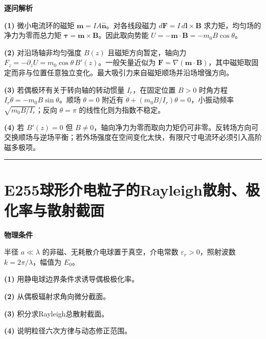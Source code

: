 \documentclass[UTF8,a4paper,11pt,oneside,openany]{ctexbook}
\begin{document}
\par\medskip\noindent\textbf{逐问解析}
\par\noindent\textbf{(1)} 微小电流环的磁矩 \(\boldsymbol m=IA\hat{\boldsymbol n}\)。对各线段磁力 \(d\boldsymbol F=I\,d\boldsymbol l\times\boldsymbol B\) 求力矩，均匀场的净力为零而总力矩 \(\boldsymbol\tau=\boldsymbol m\times\boldsymbol B\)。因此取向势能 \(U=-\boldsymbol m\cdot\boldsymbol B=-m_0B\cos\theta\)。
\par\noindent\textbf{(2)} 对沿场轴非均匀强度 \(B(z)\) 且磁矩方向暂定，轴向力 \(F_z=-\partial_z U=m_0\cos\theta\,B'(z)\)。一般矢量近似为 \(\boldsymbol F=\nabla(\boldsymbol m\cdot\boldsymbol B)\)，其中磁矩取固定而非与位置任意独立变化。最大吸引力来自磁矩顺场并沿场增强方向。
\par\noindent\textbf{(3)} 若偶极环有关于转向轴的转动惯量 \(I_r\)，在固定位置 \(B>0\) 时角方程 \(I_r\ddot\theta=-m_0B\sin\theta\)。顺场 \(\theta=0\) 附近有 \(\ddot\theta+(m_0B/I_r)\theta=0\)，小振动频率 \(\sqrt{m_0B/I_r}\)；反向 \(\theta=\pi\) 的线性化则为指数不稳定。
\par\noindent\textbf{(4)} 若 \(B'(z)=0\) 但 \(B\ne0\)，轴向净力为零而取向力矩仍可非零。反转场方向可交换顺场与逆场平衡；若外场强度在空间变化太快，有限尺寸电流环必须引入高阶磁多极项。

\par\bigskip\hrule\bigskip
\section*{E255\quad 球形介电粒子的Rayleigh散射、极化率与散射截面}
\textbf{物理条件}\par 半径 \(a\ll\lambda\) 的非磁、无耗散介电球置于真空，介电常数 \(\varepsilon_r>0\)，照射波数 \(k=2\pi/\lambda\)，幅值为 \(E_0\)。
\par\noindent\textbf{(1)} 用静电球边界条件求诱导偶极极化率。
\par\noindent\textbf{(2)} 从偶极辐射求角向微分截面。
\par\noindent\textbf{(3)} 积分求Rayleigh总散射截面。
\par\noindent\textbf{(4)} 说明粒径六次方律与动态修正范围。
\end{document}

